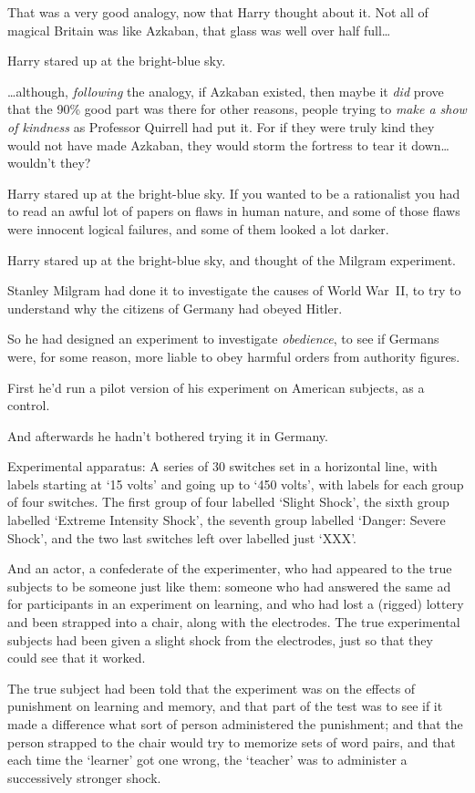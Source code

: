 That was a very good analogy, now that Harry thought about it. Not all of magical Britain was like Azkaban, that glass was well over half full{\ldots}

Harry stared up at the bright-blue sky.

{\ldots}although, \emph{following} the analogy, if Azkaban existed, then maybe it \emph{did} prove that the 90\% good part was there for other reasons, people trying to \emph{make a show of kindness} as Professor Quirrell had put it. For if they were truly kind they would not have made Azkaban, they would storm the fortress to tear it down{\ldots} wouldn't they?

Harry stared up at the bright-blue sky. If you wanted to be a rationalist you had to read an awful lot of papers on flaws in human nature, and some of those flaws were innocent logical failures, and some of them looked a lot darker.

Harry stared up at the bright-blue sky, and thought of the Milgram experiment.

Stanley Milgram had done it to investigate the causes of World War~II, to try to understand why the citizens of Germany had obeyed Hitler.

So he had designed an experiment to investigate \emph{obedience}, to see if Germans were, for some reason, more liable to obey harmful orders from authority figures.

First he'd run a pilot version of his experiment on American subjects, as a control.

And afterwards he hadn't bothered trying it in Germany.

Experimental apparatus: A series of 30 switches set in a horizontal line, with labels starting at `15 volts' and going up to `450 volts', with labels for each group of four switches. The first group of four labelled `Slight Shock', the sixth group labelled `Extreme Intensity Shock', the seventh group labelled `Danger: Severe Shock', and the two last switches left over labelled just `XXX'.

And an actor, a confederate of the experimenter, who had appeared to the true subjects to be someone just like them: someone who had answered the same ad for participants in an experiment on learning, and who had lost a (rigged) lottery and been strapped into a chair, along with the electrodes. The true experimental subjects had been given a slight shock from the electrodes, just so that they could see that it worked.

The true subject had been told that the experiment was on the effects of punishment on learning and memory, and that part of the test was to see if it made a difference what sort of person administered the punishment; and that the person strapped to the chair would try to memorize sets of word pairs, and that each time the `learner' got one wrong, the `teacher' was to administer a successively stronger shock.

